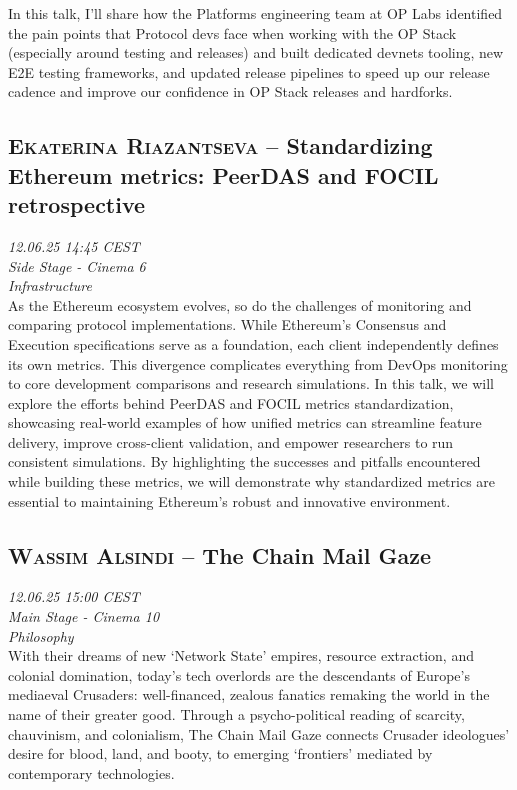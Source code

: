 In this talk, I’ll share how the Platforms engineering team at OP Labs identified the pain points that Protocol devs face when working with the OP Stack (especially around testing and releases) and built dedicated devnets tooling, new E2E testing frameworks, and updated release pipelines to speed up our release cadence and improve our confidence in OP Stack releases and hardforks.

\clearpage
\subsection {\textsc{Ekaterina Riazantseva}  -- Standardizing Ethereum metrics: PeerDAS and FOCIL retrospective} \noindent \textit {12.06.25 14:45 CEST\\ Side Stage - Cinema 6\\ Infrastructure}\\[1em] As the Ethereum ecosystem evolves, so do the challenges of monitoring and comparing protocol implementations. While Ethereum’s Consensus and Execution specifications serve as a foundation, each client independently defines its own metrics. This divergence complicates everything from DevOps monitoring to core development comparisons and research simulations. In this talk, we will explore the efforts behind PeerDAS and FOCIL metrics standardization, showcasing real-world examples of how unified metrics can streamline feature delivery, improve cross-client validation, and empower researchers to run consistent simulations. By highlighting the successes and pitfalls encountered while building these metrics, we will demonstrate why standardized metrics are essential to maintaining Ethereum’s robust and innovative environment.

\clearpage
\subsection {\textsc{Wassim Alsindi}  -- The Chain Mail Gaze} \noindent \textit {12.06.25 15:00 CEST\\ Main Stage - Cinema 10\\ Philosophy}\\[1em] With their dreams of new ‘Network State’ empires, resource extraction, and colonial domination, today’s tech overlords are the descendants of Europe’s mediaeval Crusaders: well-financed, zealous fanatics remaking the world in the name of their greater good. Through a psycho-political reading of scarcity, chauvinism, and colonialism, The Chain Mail Gaze connects Crusader ideologues’ desire for blood, land, and booty, to emerging ‘frontiers’ mediated by contemporary technologies.

